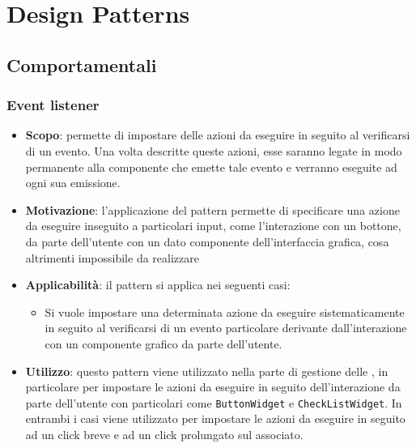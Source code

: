 \newpage
\section{Design Patterns}

\subsection{Comportamentali}
\subsubsection{Event listener}
\begin{itemize}
	\item \textbf{Scopo}: permette di impostare delle azioni da eseguire in seguito al verificarsi di un evento. Una volta descritte queste azioni, esse saranno legate in modo permanente alla componente che emette tale evento e verranno eseguite ad ogni sua emissione.
	\item \textbf{Motivazione}: l'applicazione del pattern  permette di specificare una azione da eseguire inseguito a particolari input, come l'interazione con un bottone, da parte dell'utente con un dato componente dell'interfaccia grafica, cosa altrimenti impossibile da realizzare
	\item \textbf{Applicabilità}: il pattern  si applica nei seguenti casi:
		  \begin{itemize}
		  		\item Si vuole impostare una determinata azione da eseguire sistematicamente in seguito al verificarsi di un evento particolare derivante dall'interazione con un componente grafico da parte dell'utente.
		  \end{itemize}
	\item \textbf{Utilizzo}: questo pattern viene utilizzato nella parte di gestione delle , in particolare per impostare le azioni da eseguire in seguito dell'interazione da parte dell'utente con particolari  come \texttt{ButtonWidget} e \texttt{CheckListWidget}. In entrambi i casi viene utilizzato per impostare le azioni da eseguire in seguito ad un click breve e ad un click prolungato sul  associato.
\end{itemize}

